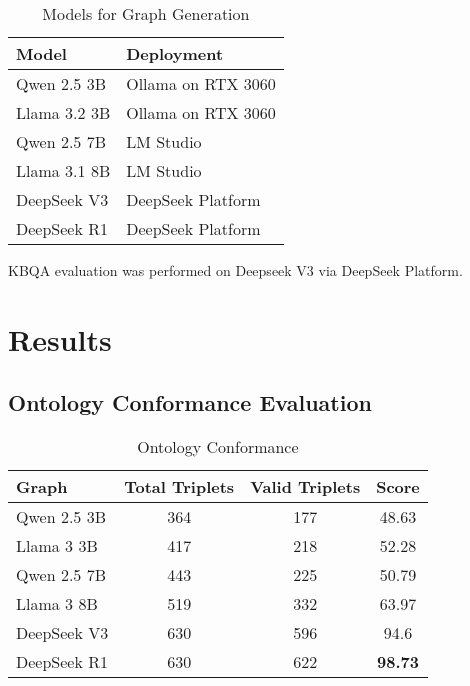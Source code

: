 \documentclass[a4, conference]{IEEEtran}
\begin{document}
\begin{table}[h]
    \centering
    \caption{Models for Graph Generation}
    \label{tab:model_deployment}
    \begin{tabular}{ll}
        \hline
        Model        & Deployment         \\
        \hline
        Qwen 2.5 3B  & Ollama on RTX 3060 \\
        Llama 3.2 3B & Ollama on RTX 3060 \\
        Qwen 2.5 7B  & LM Studio          \\
        Llama 3.1 8B & LM Studio          \\
        DeepSeek V3  & DeepSeek Platform  \\
        DeepSeek R1  & DeepSeek Platform  \\
        \hline
    \end{tabular}
\end{table}

KBQA evaluation was performed on Deepseek V3 via DeepSeek Platform.

\section{Results}

\subsection{Ontology Conformance Evaluation}

\begin{table}[h]
    \centering
    \caption{Ontology Conformance}
    \label{tab:oc_percent}
    \begin{tabular}{|l|c|c|c|}
        \hline
        Graph       & Total Triplets & Valid Triplets & Score          \\
        \hline
        Qwen 2.5 3B & 364            & 177            & 48.63          \\
        \hline
        Llama 3 3B  & 417            & 218            & 52.28          \\
        \hline
        Qwen 2.5 7B & 443            & 225            & 50.79          \\
        \hline
        Llama 3 8B  & 519            & 332            & 63.97          \\
        \hline
        DeepSeek V3 & 630            & 596            & 94.6           \\
        \hline
        DeepSeek R1 & 630            & 622            & \textbf{98.73} \\
        \hline
    \end{tabular}
\end{table}
\end{document}
